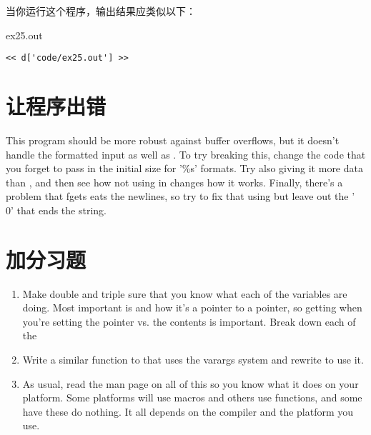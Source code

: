 当你运行这个程序，输出结果应类似以下：

\begin{code}{ex25.out}
\begin{lstlisting}
<< d['code/ex25.out'] >>
\end{lstlisting}
\end{code}

\section{让程序出错}

This program should be more robust against buffer overflows, but it doesn't
handle the formatted input as well as .  To try breaking this,
change the code that you forget to pass in the initial size for '\%s' formats.
Try also giving it more data than , and then see how not
using  in  changes how it works.  Finally,
there's a problem that fgets eats the newlines, so try to fix that using
 but leave out the '\\0' that ends the string.

\section{ 加分习题}

\begin{enumerate}
\item Make double and triple sure that you know what each of the 
    variables are doing.  Most important is  and how it's
    a pointer to a pointer, so getting when you're setting the pointer vs. the
    contents is important.  Break down each of the 
\item Write a similar function to  that uses the varargs system
    and rewrite  to use it.
\item As usual, read the man page on all of this so you know what it does
    on your platform.  Some platforms will use macros and others use
    functions, and some have these do nothing.  It all depends on the 
    compiler and the platform you use.
\end{enumerate}

